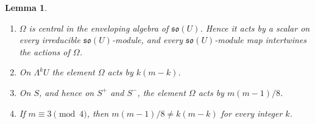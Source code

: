 \documentclass[11pt]{amsart}
\newtheorem{lemma}[theorem]{Lemma}
\theoremstyle{remark}
\newcommand{\so}{\mathfrak{so}}
\begin{document}
\begin{lemma}\label{lem:casimir}
\begin{enumerate}
\item[(o)] $\Omega$ is central in the enveloping algebra of $\so(U)$. Hence it acts by a scalar on every irreducible $\so(U)$-module, and every $\so(U)$-module map intertwines the actions of $\Omega$.
\item[(i)] On $\Lambda^kU$ the element $\Omega$ acts by $k(m-k)$.
\item[(ii)] On $S$, and hence on $S^+$ and $S^-$, the element $\Omega$ acts by $m(m-1)/8$.
\item[(iii)] If $m\equiv 3\pmod 4$, then $m(m-1)/8\ne k(m-k)$ for every integer $k$.
\end{enumerate}
\end{lemma}
\end{document}
